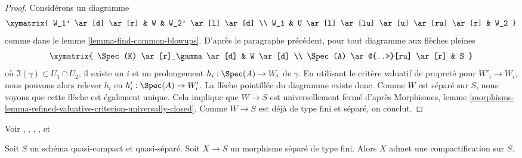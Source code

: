 \begin{proof}
\medskip\noindent
Considérons un diagramme
$$
\xymatrix{
W_1' \ar[d] \ar[r] & W & W_2' \ar[l] \ar[d] \\
W_1 & U \ar[l] \ar[lu] \ar[u] \ar[ru] \ar[r] & W_2
}
$$
comme dans le lemme \ref{lemma-find-common-blowups}. D'après le paragraphe précédent,
pour tout diagramme aux flèches pleines
$$
\xymatrix{
\Spec(K) \ar[r]_\gamma  \ar[d] & W \ar[d] \\
\Spec(A) \ar@{..>}[ru] \ar[r] & S
}
$$
où $\Im(\gamma) \subset U_1 \cap U_2$, il existe un $i$ et
un prolongement $h_i : \Spec(A) \to W_i$ de $\gamma$.
En utilisant le critère valuatif de propreté pour $W'_i \to W_i$,
nous pouvons alors relever $h_i$ en $h'_i : \Spec(A) \to W'_i$.
La flèche pointillée du diagramme existe donc. Comme $W$
est séparé sur $S$, nous voyons que cette flèche est également unique.
Cela implique que $W \to S$ est universellement fermé d'après
Morphismes, lemme
\ref{morphisms-lemma-refined-valuative-criterion-universally-closed}.
Comme $W \to S$ est déjà de type fini et séparé, on conclut.
\end{proof}

\begin{theorem}
\label{theorem-nagata}
\begin{reference}
Voir \cite{Lutkebohmert}, \cite{Conrad-Nagata}, \cite{Nagata-1},
\cite{Nagata-2}, \cite{Nagata-3} et \cite{Nagata-4}
\end{reference}
Soit $S$ un schéma quasi-compact et quasi-séparé. Soit
$X \to S$ un morphisme séparé de type fini.
Alors $X$ admet une compactification sur $S$.
\end{theorem}

